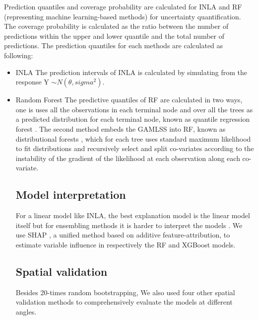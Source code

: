 \documentclass{article}
\begin{document}
Prediction quantiles and coverage probability are calculated for INLA and RF (representing machine learning-based methods) for uncertainty quantification. The coverage probability is calculated as the ratio between the number of  predictions within the upper and lower quantile and the total number of predictions. The prediction quantiles for each methods are calculated as following:
\begin{itemize}
     
\item INLA
The prediction intervals of INLA is calculated by simulating from the response Y $\sim N(\theta, sigma^2)$.  


\item Random Forest 
 The predictive quantiles of RF are calculated in two ways, one is uses all the observations in each terminal node and over all the trees as a predicted distribution for each terminal node, known as quantile regression forest \citep{meinshausen2006quantile}. The second method embeds the GAMLSS \citep{stasinopoulos2007generalized} into RF, known as distributional forests \citep{schlosser2019distributional}, which for each tree uses standard maximum likelihood to fit distributions and recursively select and split co-variates according to the instability of the gradient of the likelihood at each observation along each co-variate. 
 
\subsection{Model interpretation}
For a linear model like INLA, the best explanation model is the linear model itself but for ensembling methods it is harder to interpret the models \citep{NIPS2017_8a20a862}. We use SHAP \citep[SHapley Additive exPlanations,][]{lundberg2018explainable,NIPS2017_8a20a862}, a unified method based on additive feature-attribution, to estimate variable influence in respectively the RF and XGBoost models.   

\subsection{Spatial validation}
Besides 20-times random bootstrapping, We also used four other spatial validation methods to comprehensively evaluate the models at different angles.


\end{itemize}
\end{document}
